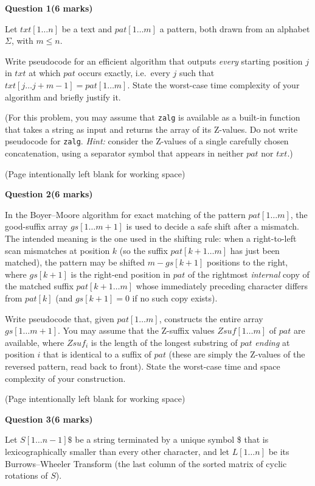 \documentclass[12pt,letterpaper]{article}
\newcommand{\marksbox}[1]{%
  \vfill
  \begin{flushright}
    \fbox{\parbox[c][1.1cm][c]{1.3cm}{\centering #1}}
  \end{flushright}
}
\newcommand{\questiontitle}[2]{%
  \textbf{Question #1}\hfill\textbf{(#2 marks)}
}
\newcommand{\workingpage}{%
  \newpage
  \begin{center}
    (Page intentionally left blank for working space)
  \end{center}
}
\begin{document}
\newpage

\questiontitle{1}{6}

Let $txt[1 \ldots n]$ be a text and $pat[1 \ldots m]$ a pattern, both drawn
from an alphabet $\Sigma$, with $m \leq n$.

Write pseudocode for an efficient algorithm that outputs \emph{every} starting
position $j$ in $txt$ at which $pat$ occurs exactly, i.e.\ every $j$ such that
$txt[j \ldots j + m - 1] = pat[1 \ldots m]$. State the worst-case time
complexity of your algorithm and briefly justify it.

(For this problem, you may assume that \texttt{zalg} is available as a built-in
function that takes a string as input and returns the array of its Z-values.
Do not write pseudocode for \texttt{zalg}. \emph{Hint:} consider the Z-values
of a single carefully chosen concatenation, using a separator symbol that
appears in neither $pat$ nor $txt$.)

\marksbox{6}

\workingpage
\newpage

\questiontitle{2}{6}

In the Boyer--Moore algorithm for exact matching of the pattern
$pat[1 \ldots m]$, the good-suffix array $gs[1 \ldots m+1]$ is used to decide a
safe shift after a mismatch. The intended meaning is the one used in the
shifting rule: when a right-to-left scan mismatches at position $k$ (so the
suffix $pat[k+1 \ldots m]$ has just been matched), the pattern may be shifted
$m - gs[k+1]$ positions to the right, where $gs[k+1]$ is the right-end position
in $pat$ of the rightmost \emph{internal} copy of the matched suffix
$pat[k+1 \ldots m]$ whose immediately preceding character differs from
$pat[k]$ (and $gs[k+1] = 0$ if no such copy exists).

Write pseudocode that, given $pat[1 \ldots m]$, constructs the entire array
$gs[1 \ldots m+1]$. You may assume that the Z-suffix values
$Zsuf[1 \ldots m]$ of $pat$ are available, where $Zsuf_i$ is the length of the
longest substring of $pat$ \emph{ending} at position $i$ that is identical to a
suffix of $pat$ (these are simply the Z-values of the reversed pattern, read
back to front). State the worst-case time and space complexity of your
construction.

\marksbox{6}

\workingpage
\newpage

\questiontitle{3}{6}

Let $S[1 \ldots n-1]\$$ be a string terminated by a unique symbol \$ that is
lexicographically smaller than every other character, and let
$L[1 \ldots n]$ be its Burrows--Wheeler Transform (the last column of the
sorted matrix of cyclic rotations of $S$).
\end{document}
